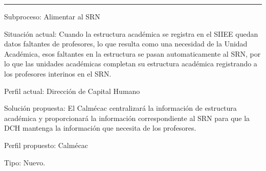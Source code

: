 	\hrule
	\vspace{0.2cm}
	\begin{Cdescription}
		\item[Subproceso:] Alimentar al SRN
		\item[Situación actual:] Cuando la estructura académica se registra en el SIIEE quedan datos faltantes de profesores, lo que resulta como una necesidad de la Unidad Académica, esos faltantes en la estructura se pasan automaticamente al SRN, por lo que las unidades académicas completan su estructura académica registrando a los profesores interinos en el SRN.
		\item[Perfil actual:] Dirección de Capital Humano
		\item[Solución propuesta:] El Calmécac centralizará la información de estructura académica y proporcionará la información correspondiente al SRN para que la DCH mantenga la información que necesita de los profesores.
		\item[Perfil propuesto:] Calmécac
		\item[Tipo:] Nuevo.
\end{Cdescription}

